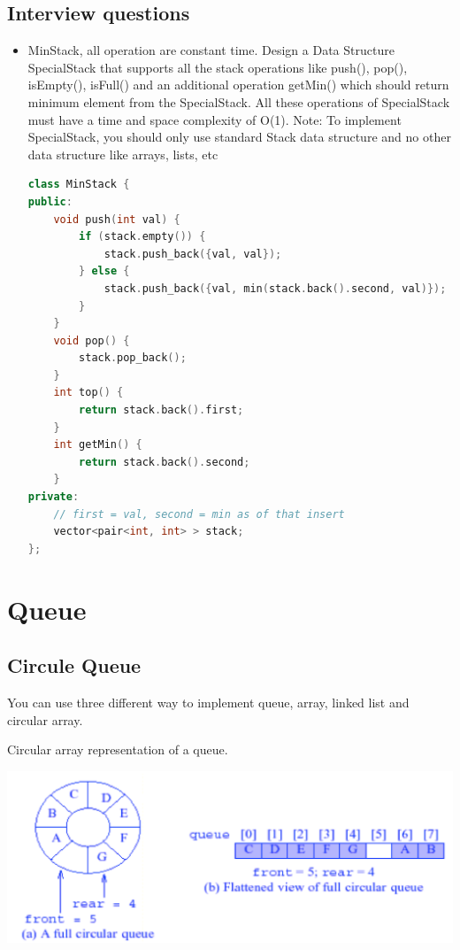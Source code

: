 \documentclass[a4paper,11pt,twoside]{book}
\begin{document}
\subsection{Interview questions}
\begin{itemize}

\item MinStack, all operation are constant time. Design a Data Structure SpecialStack that supports all the stack operations like push(), pop(), isEmpty(), isFull() and an additional operation getMin() which should return minimum element from the SpecialStack. All these operations of SpecialStack must have a time and space complexity of O(1). 
Note: To implement SpecialStack, you should only use standard Stack data structure and no other data structure like arrays, lists, etc 
\begin{lstlisting}[frame=single, language=c++, basicstyle=\scriptsize]
class MinStack {
public:
	void push(int val) {
		if (stack.empty()) {
			stack.push_back({val, val});
		} else {
			stack.push_back({val, min(stack.back().second, val)});
		}
	}
	void pop() {
		stack.pop_back();
	}
	int top() {
		return stack.back().first;
	}	
	int getMin() {
		return stack.back().second;
	}
private:
	// first = val, second = min as of that insert
	vector<pair<int, int> > stack;
};	
\end{lstlisting}

\end{itemize}

\section{Queue}

\subsection{Circule Queue}

	
\par You can use three different way to implement queue, array, linked list and circular array.
	
\par Circular array representation of a queue. 

\begin{center}
	\includegraphics[scale=0.35]{pics/cd.png} 
\end{center}
\end{document}
